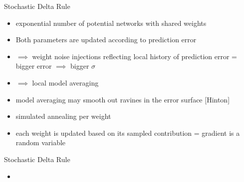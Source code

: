 \documentclass{beamer}
\begin{document}
\begin{frame}{Stochastic Delta Rule}

\begin{itemize}
\item exponential number of potential networks with shared weights

\vfill

\item Both parameters are updated according to prediction error
\item $\implies$ weight noise injections reflecting local history of prediction error = bigger error $\implies$ bigger $\sigma$
\item $\implies$ local model averaging
\item model averaging may smooth out ravines in the
error surface [Hinton]

\vfill

\item simulated annealing per weight
\item each weight is updated based on its sampled contribution = gradient is a random variable

\end{itemize}

\end{frame}


\begin{frame}{Stochastic Delta Rule}

\begin{itemize}
\item 
\end{itemize}

\end{frame}
\end{document}
